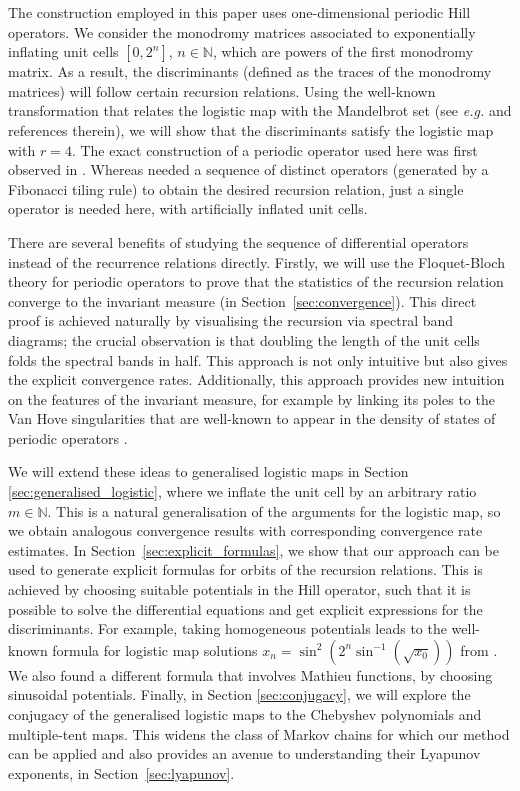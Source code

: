 \documentclass[a4paper]{article}
\theoremstyle{definition}
\numberwithin{equation}{section}
\numberwithin{theorem}{section}
\begin{document}
{The construction employed in this paper uses one-dimensional periodic Hill operators. We consider the monodromy matrices associated to exponentially inflating unit cells $[0,2^n]$, $n\in\mathbb{N}$, which are powers of the first monodromy matrix. As a result, the discriminants (defined as the traces of the monodromy matrices) will follow certain recursion relations. Using the well-known transformation that relates the logistic map with the Mandelbrot set (see \emph{e.g.} \cite{peitgen1986beauty} and references therein), we will show that the discriminants satisfy the logistic map with $r=4$. The exact construction of a periodic operator used here was first observed in \cite[Remark~4.1]{davies2022symmetry}. Whereas \cite{davies2024vanhove} needed a sequence of distinct operators (generated by a Fibonacci tiling rule) to obtain the desired recursion relation, just a single operator is needed here, with artificially inflated unit cells.

There are several benefits of studying the sequence of differential operators instead of the recurrence relations directly. Firstly, we will use the Floquet-Bloch theory for periodic operators to prove that the statistics of the recursion relation converge to the invariant measure (in Section~\ref{sec:convergence}). This direct proof is achieved naturally by visualising the recursion via spectral band diagrams; the crucial observation is that doubling the length of the unit cells folds the spectral bands in half. This approach is not only intuitive but also gives the explicit convergence rates. Additionally, this approach provides new intuition on the features of the invariant measure, for example by linking its poles to the Van Hove singularities that are well-known to appear in the density of states of periodic operators \cite{van1953occurrence}.

We will extend these ideas to generalised logistic maps in Section \ref{sec:generalised_logistic}, where we inflate the unit cell by an arbitrary ratio $m\in\mathbb{N}$. This is a natural generalisation of the arguments for the logistic map, so we obtain analogous convergence results with corresponding convergence rate estimates. In Section~\ref{sec:explicit_formulas}, we show that our approach can be used to generate explicit formulas for orbits of the recursion relations. This is achieved by choosing suitable potentials in the Hill operator, such that it is possible to solve the differential equations and get explicit expressions for the discriminants. For example, taking homogeneous potentials leads to the well-known formula for logistic map solutions $x_n=\sin^2(2^n \sin^{-1}(\sqrt{x_0}))$ from \cite{lorenz1964problem}. We also found a different formula that involves Mathieu functions, by choosing sinusoidal potentials. Finally, in Section \ref{sec:conjugacy}, we will explore the conjugacy of the generalised logistic maps to the Chebyshev polynomials and multiple-tent maps. This widens the class of Markov chains for which our method can be applied and also provides an avenue to understanding their Lyapunov exponents, in Section~\ref{sec:lyapunov}.



}
\end{document}

